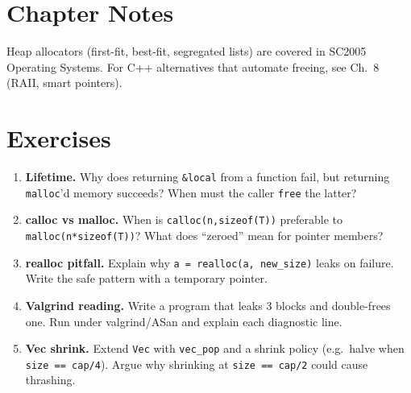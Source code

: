 \section{Chapter Notes}
Heap allocators (first-fit, best-fit, segregated lists) are covered in SC2005 Operating Systems. For C++ alternatives that automate freeing, see Ch.~8 (RAII, smart pointers).

\section{Exercises}
\begin{enumerate}[label=E4.\arabic*, leftmargin=*, itemsep=0.6em]
\item \textbf{Lifetime.} Why does returning \texttt{\&local} from a function fail, but returning \texttt{malloc}'d memory succeeds? When must the caller \texttt{free} the latter?
\item \textbf{calloc vs malloc.} When is \texttt{calloc(n,sizeof(T))} preferable to \texttt{malloc(n*sizeof(T))}? What does ``zeroed'' mean for pointer members?
\item \textbf{realloc pitfall.} Explain why \texttt{a = realloc(a, new\_size)} leaks on failure. Write the safe pattern with a temporary pointer.
\item \textbf{Valgrind reading.} Write a program that leaks 3 blocks and double-frees one. Run under valgrind/ASan and explain each diagnostic line.
\item \textbf{Vec shrink.} Extend \texttt{Vec} with \texttt{vec\_pop} and a shrink policy (e.g.\ halve when \texttt{size == cap/4}). Argue why shrinking at \texttt{size == cap/2} could cause thrashing.
\end{enumerate}
